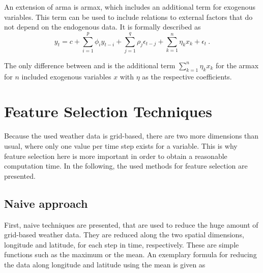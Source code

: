 An extension of \gls{arma} is \gls{armax}, which includes an additional term for exogenous variables. This term can be used to include relations to external factors that do not depend on the endogenous data. It is formally described as\\

\begin{equation}
y_t = c+\sum_{i=1}^{p}\phi_iy_{t-i}+\sum_{j=1}^{q}\rho_j\epsilon_{t-j}+\sum_{k=1}^{n}\eta_kx_k+\epsilon_t~.
\label{eq:armax}
\end{equation}

The only difference between  and  is the additional term $\sum_{k=1}^{n}\eta_kx_k$ for the \gls{armax} for $n$ included exogenous variables $x$ with $\eta$ as the respective coefficients.\\

%

\section{Feature Selection Techniques}
\label{sec:featsel}

Because the used weather data is grid-based, there are two more dimensions than usual, where only one value per time step exists for a variable. This is why feature selection here is more important in order to obtain a reasonable computation time. In the following, the used methods for feature selection are presented.\\

\subsection*{Naive approach}

First, naive techniques are presented, that are used to reduce the huge amount of grid-based weather data. They are reduced along the two spatial dimensions, longitude and latitude, for each step in time, respectively. These are simple functions such as the maximum or the mean. An exemplary formula for reducing the data along longitude and latitude using the mean is given as\\

